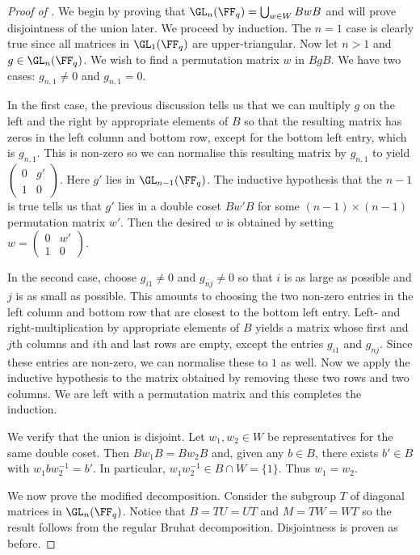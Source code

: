 \begin{proof}[Proof of ]
    We begin by proving that $\GL_n(\FF_q) = \bigcup_{w\in W} BwB$ and will prove disjointness of the union later.
    We proceed by induction.
    The $n=1$ case is clearly true since all matrices in $\GL_1(\FF_q)$ are upper-triangular.
    Now let $n>1$ and $g\in\GL_n(\FF_q)$.
    We wish to find a permutation matrix $w$ in $BgB$.
    We have two cases: $g_{n,1}\neq 0$ and $g_{n,1}=0$.

    In the first case, the previous discussion tells us that we can multiply $g$ on the left and the right by appropriate elements of $B$ so that the resulting matrix has zeros in the left column and bottom row, except for the bottom left entry, which is $g_{n,1}$.
    This is non-zero so we can normalise this resulting matrix by $g_{n,1}$ to yield $\left(\begin{smallmatrix} 0 & g' \\ 1 & 0 \end{smallmatrix}\right)$.
    Here $g'$ lies in $\GL_{n-1}(\FF_q)$.
    The inductive hypothesis that the $n-1$ is true tells us that $g'$ lies in a double coset $Bw'B$ for some $(n-1)\times(n-1)$ permutation matrix $w'$.
    Then the desired $w$ is obtained by setting $w = \left(\begin{smallmatrix} 0 & w' \\ 1 & 0 \end{smallmatrix}\right)$.

    In the second case, choose $g_{i1}\neq 0$ and $g_{nj}\neq 0$ so that $i$ is as large as possible and $j$ is as small as possible.
    This amounts to choosing the two non-zero entries in the left column and bottom row that are closest to the bottom left entry.
    Left- and right-multiplication by appropriate elements of $B$ yields a matrix whose first and $j$th columns and $i$th and last rows are empty, except the entries $g_{i1}$ and $g_{nj}$.
    Since these entries are non-zero, we can normalise these to $1$ as well.
    Now we apply the inductive hypothesis to the matrix obtained by removing these two rows and two columns.
    We are left with a permutation matrix and this completes the induction.

    We verify that the union is disjoint.
    Let $w_1,w_2\in W$ be representatives for the same double coset.
    Then $Bw_1B=Bw_2B$ and, given any $b\in B$, there exists $b'\in B$ with $w_1bw_2^{-1} = b'$.
    In particular, $w_1w_2^{-1}\in B\cap W = \{1\}$.
    Thus $w_1=w_2$.

    We now prove the modified decomposition.
    Consider the subgroup $T$ of diagonal matrices in $\GL_n(\FF_q)$.
    Notice that $B=TU=UT$ and $M=TW=WT$ so the result follows from the regular Bruhat decomposition.
    Disjointness is proven as before.
\end{proof}
